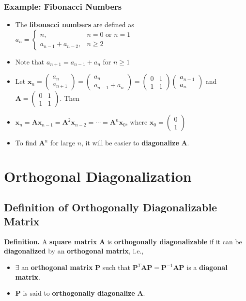 \documentclass[../ma2001_notes.tex]{subfiles}
\begin{document}
\subsubsection{Example: Fibonacci Numbers}
\begin{itemize}
	\item The \textbf{fibonacci numbers} are defined as \(a_n=\begin{cases}
		n, & n=0\text{ or }n=1 \\
		a_{n-1}+a_{n-2}, & n\geq2
	\end{cases}\)
	\item Note that \(a_{n+1}=a_{n-1}+a_n\) for \(n\geq1\)
	\item Let \(\bm{x}_n=\begin{pmatrix}
		a_n \\ a_{n+1}
	\end{pmatrix}=\begin{pmatrix}
		a_n \\ a_{n-1}+a_n
	\end{pmatrix}=\begin{pmatrix}
		0 & 1 \\ 1 & 1
	\end{pmatrix}\begin{pmatrix}
		a_{n-1} \\ a_n
	\end{pmatrix}\) and \(\bm{A}=\begin{pmatrix}
		0 & 1 \\ 1 & 1
	\end{pmatrix}\). Then
	\item\(\bm{x}_n=\bm{Ax}_{n-1}=\bm{A}^2\bm{x}_{n-2}=\cdots=\bm{A}^n\bm{x}_0\), where \(\bm{x}_0=\begin{pmatrix}
		0 \\ 1
	\end{pmatrix}\)
	\item To find \(\bm{A}^n\) for large \(n\), it will be easier to \textbf{diagonalize} \(\bm{A}\).
\end{itemize}

\section{Orthogonal Diagonalization}
\subsection{Definition of Orthogonally Diagonalizable Matrix}
\textbf{Definition.} A \textbf{square matrix} \(\bm{A}\) is \textbf{orthogonally diagonalizable} if it can be \textbf{diagonalized} by an \textbf{orthogonal matrix}, i.e.,
\begin{itemize}
	\item\(\exists\) an \textbf{orthogonal matrix} \(\bm{P}\) such that \(\bm{P}^T\bm{AP}=\bm{P}^{-1}\bm{AP}\) is a \textbf{diagonal matrix}.
	\item\(\bm{P}\) is said to \textbf{orthogonally diagonalize} \(\bm{A}\).
\end{itemize}
\end{document}
